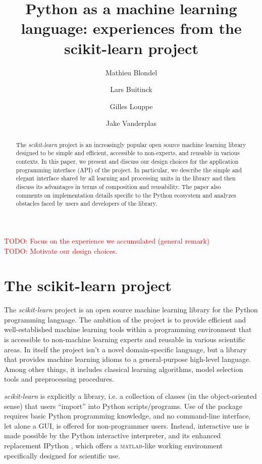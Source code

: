 \documentclass{llncs}
\title{Python as a machine learning language:
       experiences from the scikit-learn project}
\author{Mathieu Blondel\inst{1} \and
        Lars Buitinck\inst{2} \and
        Gilles Louppe\inst{3} \and
        Jake Vanderplas\inst{4}}
\institute{Graduate School of System Informatics, Kobe University \and
           Informatics Institute, University of Amsterdam \and
           Department of EE \& CS, University of Liège \and
           Astronomy Department, University of Washington}
\newcommand{\sklearn}{\textit{scikit-learn}\xspace}
\begin{document}
\maketitle

\begin{abstract}
The \sklearn project is an increasingly popular open source machine
learning library designed to be simple and efficient, accessible to non-experts,
and reusable in various contexts. In this paper, we present and discuss our
design choices for the application programming interface (API) of the project.
In particular, we describe the simple and elegant interface shared by all
learning and processing units in the library and then discuss its advantages in
terms of composition and reusability. The paper also comments on implementation
details specific to the Python ecosystem and analyzes obstacles faced by users
and developers of the library.
\end{abstract}

\noindent \textcolor{red}{TODO: Focus on the experience we accumulated (general remark)}\\
\textcolor{red}{TODO: Motivate our design choices.}

\section{The scikit-learn project}

The \sklearn project \citep{pedregosa2011} is an open source
machine learning library for the Python programming language. The ambition of
the project is to provide efficient and well-established machine learning tools
within a programming environment that is accessible to non-machine learning
experts and reusable in various scientific areas. In itself the project isn't
a novel domain-specific language, but a library that provides machine
learning idioms to a general-purpose high-level language. Among other things,
it includes classical learning algorithms, model selection tools and
preprocessing procedures.

\sklearn is explicitly a library,
i.e. a collection of classes (in the object-oriented sense)
that users ``import'' into Python scripts/programs.
Use of the package requires basic Python programming knowledge,
and no command-line interface, let alone a GUI,
is offered for non-programmer users.
Instead, interactive use is made possible
by the Python interactive interpreter,
and its enhanced replacement IPython \citep{perez2007ipython},
which offers a \textsc{matlab}-like working environment
specifically designed for scientific use.
\end{document}
